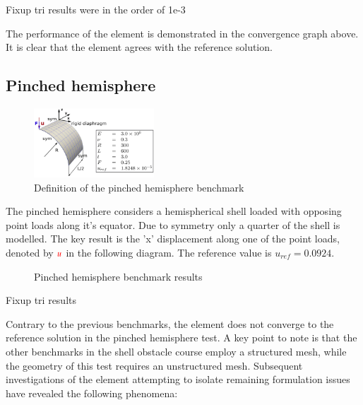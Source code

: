  

Fixup tri results were in the order of 1e-3

The performance of the element is demonstrated in the convergence graph above. It is clear that the element agrees with the reference solution.

\subsection{Pinched hemisphere}

\begin{figure}
	\centering
	\includegraphics[width=0.4\textwidth]{images/pinchedcylinder.png}
	\caption{Definition of the pinched hemisphere benchmark \cite{Bou13}}
\end{figure}

The pinched hemisphere considers a hemispherical shell loaded with opposing point loads along it's equator. Due to symmetry only a quarter of the shell is modelled. The key result is the 'x' displacement along one of the point loads, denoted by $\textcolor{red}{u}$ in the following diagram. The reference value is $u_{ref} =  0.0924$. 


\begin{figure}[H]
	\caption{\label{ref_label_overall}Pinched hemisphere benchmark results}
\end{figure}

Fixup tri results

Contrary to the previous benchmarks, the element does not converge to the reference solution in the pinched hemisphere test.  A key point to note is that the other benchmarks in the shell obstacle course employ a structured mesh, while the geometry of this test requires an unstructured mesh. Subsequent investigations of the element attempting to isolate remaining formulation issues have revealed the following phenomena:

